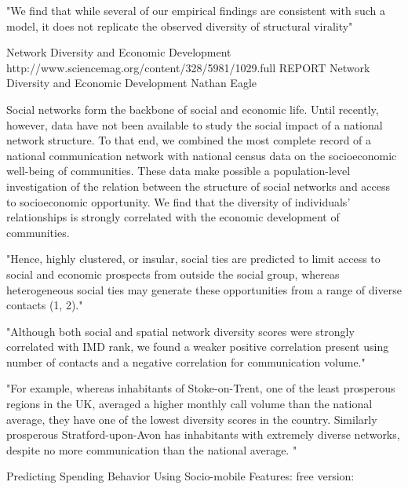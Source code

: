 {"We find that while several of our empirical findings are consistent with such a model, it does not replicate the observed diversity of structural virality"











Network Diversity and Economic Development
http://www.sciencemag.org/content/328/5981/1029.full
REPORT
Network Diversity and Economic Development
Nathan Eagle

Social networks form the backbone of social and economic life. Until recently, however, data have not been available to study the social impact of a national network structure. To that end, we combined the most complete record of a national communication network with national census data on the socioeconomic well-being of communities. These data make possible a population-level investigation of the relation between the structure of social networks and access to socioeconomic opportunity. We find that the diversity of individuals’ relationships is strongly correlated with the economic development of communities.



"Hence, highly clustered, or insular, social ties are predicted to limit access to social and economic prospects from outside the social group, whereas heterogeneous social ties may generate these opportunities from a range of diverse contacts (1, 2)."

"Although both social and spatial network diversity scores were strongly correlated with IMD rank, we found a weaker positive correlation present using number of contacts and a negative correlation for communication volume."

"For example, whereas inhabitants of Stoke-on-Trent, one of the least prosperous regions in the UK, averaged a higher monthly call volume than the national average, they have one of the lowest diversity scores in the country. Similarly prosperous Stratford-upon-Avon has inhabitants with extremely diverse networks, despite no more communication than the national average. "




Predicting Spending Behavior Using Socio-mobile Features:
free version:

}
